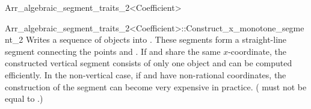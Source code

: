 \begin{ccRefClass}{Arr_algebraic_segment_traits_2<Coefficient>}
\begin{ccClass}{Arr_algebraic_segment_traits_2<Coefficient>::Construct_x_monotone_segment_2}
        {Writes a sequence of  objects into .
         These segments form a straight-line segment connecting
	 the points  and . If  and  share the
	 same $x$-coordinate, the constructed vertical segment consists of
	 only one  object and can be computed
	 efficiently. In the non-vertical case, 
	 if  and  have non-rational coordinates, 
	 the construction 
	 of the segment can become very expensive in practice.
         \ccPrecond( must not be equal to .)
	}


\end{ccClass}




\ccGlue
{}
\ccGlue
{}


\end{ccRefClass}

\ccRefPageEnd

